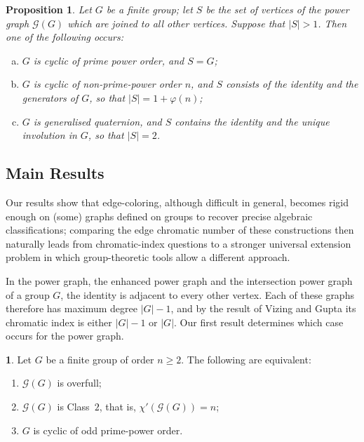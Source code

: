 \documentclass{article}
\newtheorem{proposition}[theorem]{Proposition}
\theoremstyle{definition}
\theoremstyle{indentclaim}
\theoremstyle{named}
\theoremstyle{named}
\newcommand{\mainthmname}{}
\newtheorem*{mainthminner}{\mainthmname}
\newenvironment{mainthm}[1]
  {\renewcommand{\mainthmname}{#1}\begin{mainthminner}}
  {\end{mainthminner}}
\begin{document}
\begin{proposition}\cite{PJC2}\label{non trivial center implications}
     \textit{Let $G$ be a finite group; let $S$ be the set of vertices of the power graph $\mathscr{G}(G)$ which are joined to all other vertices. Suppose that $|S| > 1$. Then one of the following occurs:}
     \begin{enumerate}[(a)]
    \item $G$ is cyclic of prime power order, and $S = G$;
    \item $G$ is cyclic of non-prime-power order $n$, and $S$ consists of the identity and the generators of $G$, so that $|S| = 1 + \varphi(n)$;
    \item $G$ is generalised quaternion, and $S$ contains the identity and the unique involution in $G$, so that $|S| = 2$.
    \end{enumerate}
\end{proposition}


\subsection{Main Results} 
 
Our results show that edge-coloring, although difficult in general, becomes rigid enough on (some) graphs defined on groups to recover precise algebraic classifications; comparing the edge chromatic number of these constructions then naturally leads from chromatic-index questions to a stronger universal extension problem in which group-theoretic tools allow a different approach. 

In the power graph, the enhanced power graph and the intersection power
graph of a group $G$, the identity is adjacent to every other vertex. Each of these graphs 
therefore has maximum degree $|G|-1$, and by the result of Vizing and Gupta
its chromatic index is either $|G|-1$ or $|G|$. Our first result determines
which case occurs for the power graph.
 
\begin{mainthm}{Theorems~\ref{ovf iff} and~\ref{thm:pg-class2}}\label{thmA}
Let $G$ be a finite group of order $n\geq 2$. The following are equivalent:
\begin{enumerate}
  \item[(i)] $\mathscr{G}(G)$ is overfull;
  \item[(ii)] $\mathscr{G}(G)$ is Class~$2$, that is, $\chi'(\mathscr{G}(G))=n$;
  \item[(iii)] $G$ is cyclic of odd prime-power order.
\end{enumerate}
\end{mainthm}
 
\end{document}
